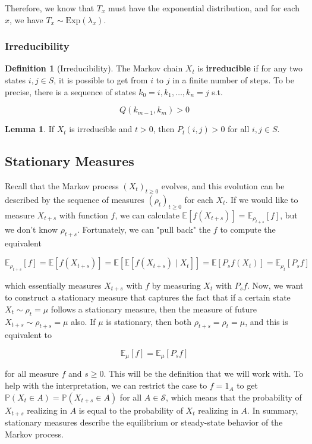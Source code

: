 \documentclass{article}
\theoremstyle{definition}
\newtheorem{lemma}[theorem]{Lemma}
\theoremstyle{remark}
\theoremstyle{definition}
\newtheorem{definition}{Definition}[section]
\begin{document}
      Therefore, we know that $T_x$ must have the exponential distribution, and for each $x$, we have $T_x \sim \mathrm{Exp}(\lambda_x)$. 

    \subsubsection{Irreducibility}

      \begin{definition}[Irreducibility]
        The Markov chain $X_t$ is \textbf{irreducible} if for any two states $i, j \in S$, it is possible to get from $i$ to $j$ in a finite number of steps. To be precise, there is a sequence of states $k_0 = i, k_1, \ldots, k_n = j$ s.t. 

          \[Q(k_{m-1}, k_m) > 0\]
      \end{definition}

      \begin{lemma}
        If $X_t$ is irreducible and $t > 0$, then $P_t (i, j) > 0$ for all $i, j \in S$. 
      \end{lemma}

  \subsection{Stationary Measures}

    Recall that the Markov process $(X_t)_{t \geq 0}$ evolves, and this evolution can be described by the sequence of measures $(\rho_t)_{t \geq 0}$ for each $X_t$. If we would like to measure $X_{t + s}$ with function $f$, we can calculate $\mathbb{E}[f(X_{t + s})] = \mathbb{E}_{\rho_{t + s}} [f]$, but we don't know $\rho_{t + s}$. Fortunately, we can "pull back" the $f$ to compute the equivalent 

      \[\mathbb{E}_{\rho_{t + s}} [f] = \mathbb{E}[f(X_{t + s})] = \mathbb{E}[\mathbb{E}[ f(X_{t + s}) \mid X_t]] = \mathbb{E}[P_s f (X_t)] = \mathbb{E}_{\rho_{t}} [ P_s f] \]

    which essentially measures $X_{t + s}$ with $f$ by measuring $X_t$ with $P_s f$. Now, we want to construct a stationary measure that captures the fact that if a certain state $X_t \sim \rho_t = \mu$ follows a stationary measure, then the measure of future $X_{t + s} \sim \rho_{t + s} = \mu$ also. If $\mu$ is stationary, then both $\rho_{t + s} = \rho_t = \mu$, and this is equivalent to

      \[\mathbb{E}_\mu [f] = \mathbb{E}_\mu [P_s f]\]

    for all measure $f$ and $s \geq 0$. This will be the definition that we will work with. To help with the interpretation, we can restrict the case to $f = 1_A$ to get $\mathbb{P}(X_t \in A) = \mathbb{P}(X_{t + s} \in A)$ for all $A \in \mathcal{S}$, which means that the probability of $X_{t + s}$ realizing in $A$ is equal to the probability of $X_t$ realizing in $A$. In summary, stationary measures describe the equilibrium or steady-state behavior of the Markov process.  
\end{document}
